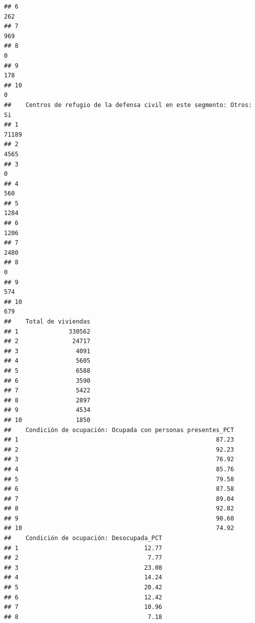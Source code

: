 \documentclass[11pt,]{article}
\begin{document}
\begin{verbatim}
## 6                                                                            262
## 7                                                                            969
## 8                                                                              0
## 9                                                                            178
## 10                                                                             0
##    Centros de refugio de la defensa civil en este segmento: Otros: Si
## 1                                                               71189
## 2                                                                4565
## 3                                                                   0
## 4                                                                 560
## 5                                                                1284
## 6                                                                1206
## 7                                                                2480
## 8                                                                   0
## 9                                                                 574
## 10                                                                679
##    Total de viviendas
## 1              330562
## 2               24717
## 3                4091
## 4                5605
## 5                6588
## 6                3590
## 7                5422
## 8                2897
## 9                4534
## 10               1850
##    Condición de ocupación: Ocupada con personas presentes_PCT
## 1                                                       87.23
## 2                                                       92.23
## 3                                                       76.92
## 4                                                       85.76
## 5                                                       79.58
## 6                                                       87.58
## 7                                                       89.04
## 8                                                       92.82
## 9                                                       90.60
## 10                                                      74.92
##    Condición de ocupación: Desocupada_PCT
## 1                                   12.77
## 2                                    7.77
## 3                                   23.08
## 4                                   14.24
## 5                                   20.42
## 6                                   12.42
## 7                                   10.96
## 8                                    7.18

\end{verbatim}
\end{document}
